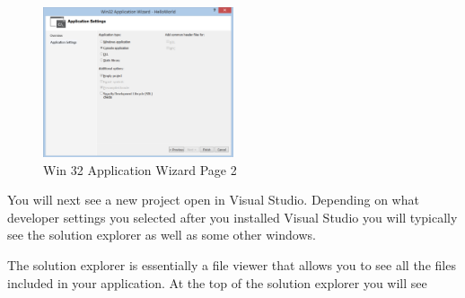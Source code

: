 \begin{figure}
  \centering
  \includegraphics[width=0.5\textwidth]{diagrams/win32_application_wizard_page2.pdf}
  \caption{Win 32 Application Wizard Page 2}\label{fig:win32-application-wizard-page2}
\end{figure}

You will next see a new project open in Visual Studio. Depending on what developer settings you selected after you installed Visual Studio you will typically see the solution explorer as well as some other windows.

The solution explorer is essentially a file viewer that allows you to see all the files included in your application. At the top of the solution explorer you will see 